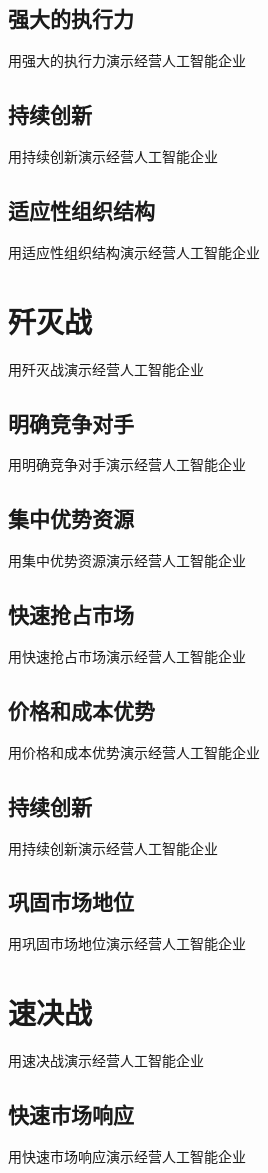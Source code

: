 \documentclass[12pt]{book}
\begin{document}
\subsection{强大的执行力}
用强大的执行力演示经营人工智能企业

\subsection{持续创新}
用持续创新演示经营人工智能企业

\subsection{适应性组织结构}
用适应性组织结构演示经营人工智能企业

\section{歼灭战}
用歼灭战演示经营人工智能企业
\subsection{明确竞争对手}
用明确竞争对手演示经营人工智能企业
\subsection{集中优势资源}
用集中优势资源演示经营人工智能企业
\subsection{快速抢占市场}
用快速抢占市场演示经营人工智能企业
\subsection{价格和成本优势}
用价格和成本优势演示经营人工智能企业
\subsection{持续创新}
用持续创新演示经营人工智能企业
\subsection{巩固市场地位}
用巩固市场地位演示经营人工智能企业

\section{速决战}
用速决战演示经营人工智能企业
\subsection{快速市场响应}
用快速市场响应演示经营人工智能企业
\end{document}
